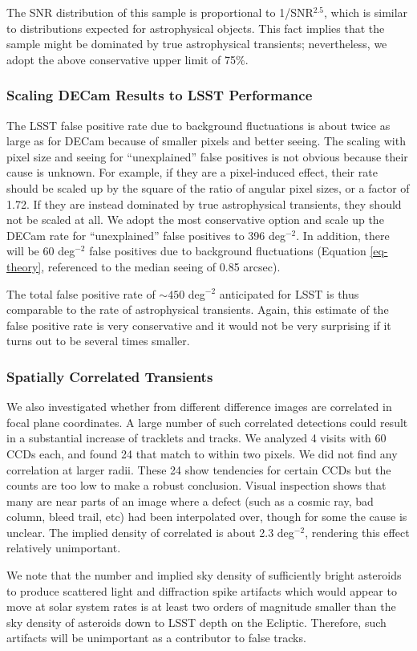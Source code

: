The SNR distribution of this sample is proportional to 1/SNR$^{2.5}$, which
is similar to distributions expected for astrophysical objects. This fact implies
that the sample might be dominated by true astrophysical transients; nevertheless,
we adopt the above conservative upper limit of 75\%.


\subsubsection{Scaling DECam Results to LSST Performance}

The LSST false positive rate due to background fluctuations is about twice
as large as for DECam because of smaller pixels and better seeing. The scaling
with pixel size and seeing for ``unexplained'' false positives is not obvious
because their cause is unknown. For example, if they are a pixel-induced effect,
their rate should be scaled up by the square of the ratio of angular pixel sizes, or
a factor of 1.72. If they are instead dominated by true astrophysical transients,
they should not be scaled at all. We adopt the most conservative option and
scale up the DECam rate for ``unexplained'' false positives to 396 deg$^{-2}$.
In addition, there will be 60 deg$^{-2}$ false positives due to background
fluctuations (Equation \ref{eq-theory}, referenced to the median seeing of 0.85 arcsec).

The total false positive rate of $\sim450$ deg$^{-2}$ anticipated for LSST is thus
comparable to the rate of astrophysical transients. Again, this estimate of the false
positive rate is very conservative and it would not be very surprising if it turns out
to be several times smaller.

\subsubsection{Spatially Correlated Transients}


We also investigated whether \DIASources from different difference images are correlated
in focal plane coordinates. A large number of such correlated detections could result in
a substantial increase of tracklets and tracks. We analyzed 4 visits with 60 CCDs each,
and found 24 \DIASources that match to within two pixels. We did not find any correlation at
larger radii. These 24 \DIASources show tendencies for certain CCDs but the counts are too
low to make a robust conclusion. Visual inspection shows that many are near
parts of an image where a defect (such as a cosmic ray, bad column, bleed trail,
etc) had been interpolated over, though for some the cause is unclear. The
implied density of correlated
\DIASources is about 2.3 deg$^{-2}$, rendering this effect relatively unimportant.

We note that the number and implied sky density of sufficiently bright asteroids to produce 
scattered light and diffraction spike artifacts which would appear to move at solar system
rates is at least two orders of magnitude smaller than the sky density of asteroids down 
to LSST depth on the Ecliptic. Therefore, such artifacts will be unimportant as a contributor 
to false tracks.
